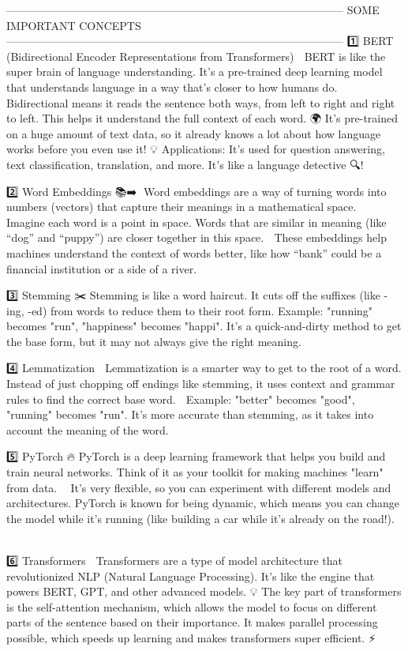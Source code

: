 --------------------------------------------------------------------------------------------
SOME IMPORTANT CONCEPTS
--------------------------------------------------------------------------------------------
1️⃣ BERT (Bidirectional Encoder Representations from Transformers) 🤖
BERT is like the super brain of language understanding. It's a pre-trained deep learning model that understands language in a way that’s closer to how humans do. 🧠
Bidirectional means it reads the sentence both ways, from left to right and right to left. This helps it understand the full context of each word. 🌍
It’s pre-trained on a huge amount of text data, so it already knows a lot about how language works before you even use it! 💡
Applications: It's used for question answering, text classification, translation, and more. It's like a language detective 🔍!

2️⃣ Word Embeddings 📚➡️💎
Word embeddings are a way of turning words into numbers (vectors) that capture their meanings in a mathematical space. 🧮
Imagine each word is a point in space. Words that are similar in meaning (like “dog” and “puppy”) are closer together in this space. 🐶
These embeddings help machines understand the context of words better, like how “bank” could be a financial institution or a side of a river. 🏦🌊

3️⃣ Stemming ✂️
Stemming is like a word haircut. It cuts off the suffixes (like -ing, -ed) from words to reduce them to their root form.
Example: "running" becomes "run", "happiness" becomes "happi".
It’s a quick-and-dirty method to get the base form, but it may not always give the right meaning. 🤔

4️⃣ Lemmatization 🔄
Lemmatization is a smarter way to get to the root of a word. Instead of just chopping off endings like stemming, it uses context and grammar rules to find the correct base word. 🧩
Example: "better" becomes "good", "running" becomes "run".
It's more accurate than stemming, as it takes into account the meaning of the word. 🌟

5️⃣ PyTorch 🔥
PyTorch is a deep learning framework that helps you build and train neural networks. Think of it as your toolkit for making machines "learn" from data. 🔧🤖
It’s very flexible, so you can experiment with different models and architectures.
PyTorch is known for being dynamic, which means you can change the model while it's running (like building a car while it's already on the road!). 🚗💨

6️⃣ Transformers 🚀
Transformers are a type of model architecture that revolutionized NLP (Natural Language Processing). It's like the engine that powers BERT, GPT, and other advanced models. 💡
The key part of transformers is the self-attention mechanism, which allows the model to focus on different parts of the sentence based on their importance.
It makes parallel processing possible, which speeds up learning and makes transformers super efficient. ⚡

